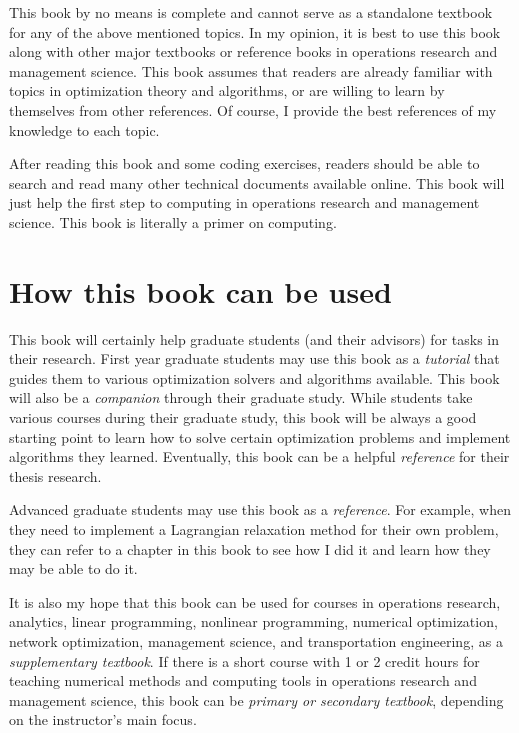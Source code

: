This book by no means is complete and cannot serve as a standalone textbook for any of the above mentioned topics. In my opinion, it is best to use this book along with other major textbooks or reference books in operations research and management science. This book assumes that readers are already familiar with topics in optimization theory and algorithms, or are willing to learn by themselves from other references. Of course, I provide the best references of my knowledge to each topic. 

After reading this book and some coding exercises, readers should be able to search and read many other technical documents available online. This book will just help the first step to computing in operations research and management science. This book is literally a primer on computing.



\section*{How this book can be used}

This book will certainly help graduate students (and their advisors) for tasks in their research. First year graduate students may use this book as a \emph{tutorial} that guides them to various optimization solvers and algorithms available. This book will also be a \emph{companion} through their graduate study. While students take various courses during their graduate study, this book will be always a good starting point to learn how to solve certain optimization problems and implement algorithms they learned. Eventually, this book can be a helpful \emph{reference} for their thesis research.

Advanced graduate students may use this book as a \emph{reference}. For example, when they need to implement a Lagrangian relaxation method for their own problem, they can refer to a chapter in this book to see how I did it and learn how they may be able to do it.  

It is also my hope that this book can be used for courses in operations research, analytics, linear programming, nonlinear programming, numerical optimization, network optimization, management science, and transportation engineering, as a \emph{supplementary textbook}. If there is a short course with 1 or 2 credit hours for teaching numerical methods and computing tools in operations research and management science, this book can be \emph{primary or secondary textbook}, depending on the instructor's main focus.



